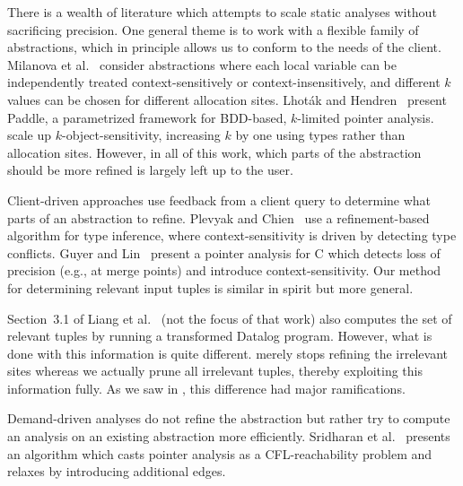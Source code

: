 
There is a wealth of literature which attempts to scale static analyses without
sacrificing precision.  One general theme is to work with a flexible family of
abstractions, which in principle allows us to conform to the needs of the
client.  Milanova et al.~\cite{kobj,MilanovaRountevRyder2005} consider
abstractions where each local variable can be independently treated
context-sensitively or context-insensitively, and different $k$ values can be
chosen for different allocation sites.  Lhot\'{a}k and
Hendren~\cite{LhotakHendren2006,LhotakHendren2008} present Paddle, a
parametrized framework for BDD-based, $k$-limited pointer analysis.
\cite{smaragdakis11context} scale up $k$-object-sensitivity, increasing $k$ by one
using types rather than allocation sites.  However, in all of this work, which parts of the
abstraction should be more refined is largely left up to the user.

Client-driven approaches use feedback from a client query to determine what
parts of an abstraction to refine.
Plevyak and Chien~\cite{PlevyakChien1994} use a refinement-based algorithm for
type inference, where context-sensitivity is driven by detecting type conflicts.
Guyer and Lin~\cite{GuyerLin2003} present a pointer analysis for C
which detects loss of precision (e.g., at merge points) and introduce context-sensitivity.
Our method for determining relevant input tuples is similar in spirit but more general.

Section~3.1 of Liang et al.~\cite{liang11minimal} (not the focus of that work)
also computes the set of relevant tuples by running a transformed Datalog program.  However, what
is done with this information is quite different.  \cite{liang11minimal} merely
stops refining the irrelevant sites whereas we actually prune all irrelevant
tuples, thereby exploiting this information fully.  As we saw in
, this difference had major ramifications.


Demand-driven analyses \cite{HeintzeTardieu2001,ZhengRugina2008} do not refine
the abstraction but rather try to compute an analysis on an existing
abstraction more efficiently.
Sridharan et al.~\cite{SridharanBodik2006} presents an algorithm
which casts pointer analysis as a CFL-reachability problem and relaxes by
introducing additional edges.

